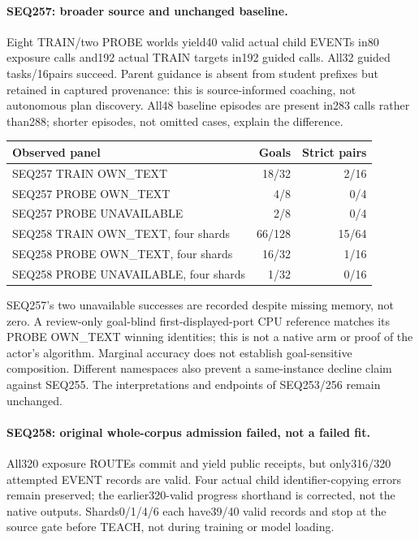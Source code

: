 \documentclass{article}
\begin{document}
\paragraph{SEQ257: broader source and unchanged baseline.}
Eight TRAIN/two PROBE worlds yield40 valid actual child EVENTs in80 exposure
calls and192 actual TRAIN targets in192 guided calls. All32 guided tasks/16pairs
succeed. Parent guidance is absent from student prefixes but retained in captured
provenance: this is source-informed coaching, not autonomous plan discovery.
All48 baseline episodes are present in283 calls rather than288; shorter episodes,
not omitted cases, explain the difference.
\begin{center}
\small
\begin{tabular}{lrr}
\toprule
Observed panel & Goals & Strict pairs \\
\midrule
SEQ257 TRAIN OWN\_TEXT & 18/32 & 2/16 \\
SEQ257 PROBE OWN\_TEXT & 4/8 & 0/4 \\
SEQ257 PROBE UNAVAILABLE & 2/8 & 0/4 \\
SEQ258 TRAIN OWN\_TEXT, four shards & 66/128 & 15/64 \\
SEQ258 PROBE OWN\_TEXT, four shards & 16/32 & 1/16 \\
SEQ258 PROBE UNAVAILABLE, four shards & 1/32 & 0/16 \\
\bottomrule
\end{tabular}
\end{center}
SEQ257's two unavailable successes are recorded despite missing memory, not zero.
A review-only goal-blind first-displayed-port CPU reference matches its PROBE
OWN\_TEXT winning identities; this is not a native arm or proof of the actor's
algorithm. Marginal accuracy does not establish goal-sensitive composition.
Different namespaces also prevent a same-instance decline claim against SEQ255.
The interpretations and endpoints of SEQ253/256 remain unchanged.

\paragraph{SEQ258: original whole-corpus admission failed, not a failed fit.}
All320 exposure ROUTEs commit and yield public receipts, but only316/320 attempted
EVENT records are valid. Four actual child identifier-copying errors remain
preserved; the earlier320-valid progress shorthand is corrected, not the native
outputs. Shards0/1/4/6 each have39/40 valid records and stop at the source gate
before TEACH, not during training or model loading.
\end{document}
